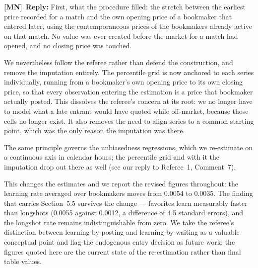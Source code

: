 \documentclass[letterpaper,12pt]{article}
\newcounter{b}
\newcommand{\ReplyMN}[1]{\par\noindent%
  \textcolor{mncol}{\textbf{[MN]}}~\textbf{Reply:} #1}
\begin{document}
\begin{enumerate}
\ReplyMN{First, what the procedure filled: the stretch between the earliest price recorded for a match and the own opening price of a bookmaker that entered later, using the contemporaneous prices of the bookmakers already active on that match. No value was ever created before the market for a match had opened, and no closing price was touched.

We nevertheless follow the referee rather than defend the construction, and remove the imputation entirely. The percentile grid is now anchored to each series individually, running from a bookmaker's own opening price to its own closing price, so that every observation entering the estimation is a price that bookmaker actually posted. This dissolves the referee's concern at its root: we no longer have to model what a late entrant would have quoted while off-market, because those cells no longer exist. It also removes the need to align series to a common starting point, which was the only reason the imputation was there.

The same principle governs the unbiasedness regressions, which we re-estimate on a continuous axis in calendar hours; the percentile grid and with it the imputation drop out there as well (see our reply to Referee~1, Comment~7).

This changes the estimates and we report the revised figures throughout: the learning rate averaged over bookmakers moves from 0.0054 to 0.0035. The finding that carries Section~5.5 survives the change --- favorites learn measurably faster than longshots (0.0055 against 0.0012, a difference of 4.5 standard errors), and the longshot rate remains indistinguishable from zero. We take the referee's distinction between learning-by-posting and learning-by-waiting as a valuable conceptual point and flag the endogenous entry decision as future work; the figures quoted here are the current state of the re-estimation rather than final table values.}


\end{enumerate}
\end{document}
